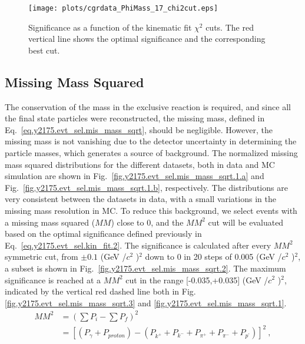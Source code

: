 \begin{figure}[H]
    \centering
        \texttt{[image: plots/cgrdata\_PhiMass\_17\_chi2cut.eps]}
        \caption{Significance as a function of the kinematic fit $\chi^{2}$ cuts. The red vertical line shows the optimal significance and the corresponding best cut.}
        \label{fig.y2175.evt_sel.kin_fit.3}
\end{figure}

\subsection{Missing Mass Squared}
\label{chap.y2175.evt_sel.mis_mass_sqrt}

The conservation of the mass in the exclusive reaction is required, and since all the final state particles were reconstructed, the missing mass, defined in Eq.~\ref{eq.y2175.evt_sel.mis_mass_sqrt}, should be negligible. However, the missing mass is not vanishing due to the detector uncertainty in determining the particle masses, which generates a source of background. The normalized missing mass squared distributions for the different datasets, both in data and MC simulation are shown in Fig.~\ref{fig.y2175.evt_sel.mis_mass_sqrt.1.a} and Fig.~\ref{fig.y2175.evt_sel.mis_mass_sqrt.1.b}, respectively. The distributions are very consistent between the datasets in data, with a small variations in the missing mass resolution in MC. To reduce this background, we select events with a missing mass squared ($MM$) close to 0, and the $MM^{2}$ cut will be evaluated based on the optimal significance defined previously in Eq.~\ref{eq.y2175.evt_sel.kin_fit.2}. The significance is calculated after every $MM^{2}$ symmetric cut, from $\pm 0.1$ (GeV /$c^2$ )$^2$ down to 0 in 20 steps of 0.005 (GeV /$c^2$ )$^2$, a subset is shown in Fig.~\ref{fig.y2175.evt_sel.mis_mass_sqrt.2}. The maximum significance is reached at a $MM^{2}$ cut in the range [-0.035,+0.035] (GeV /$c^2$ )$^2$, indicated by the vertical red dashed line both in Fig.\ref{fig.y2175.evt_sel.mis_mass_sqrt.3} and \ref{fig.y2175.evt_sel.mis_mass_sqrt.1}.
\begin{equation}
    \label{eq.y2175.evt_sel.mis_mass_sqrt}
    \begin{aligned}
        MM^2 &= \left(\sum P_{i} - \sum P_{f}\right)^2 \\
             &= [(P_{\gamma} + P_{proton}) - (P_{k^+} + P_{k^-} + P_{\pi^+} + P_{\pi^-} + P_{p^{\prime}})]^2~,
    \end{aligned}    
\end{equation}

